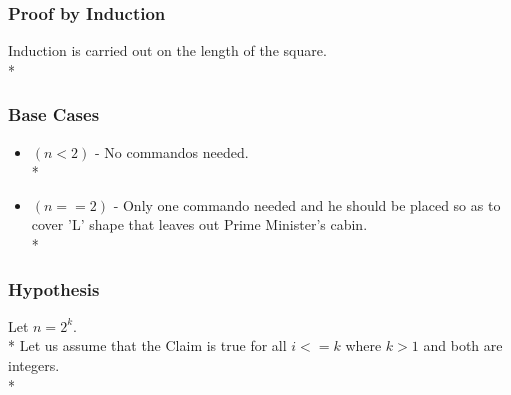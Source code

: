 \documentclass{article}
\begin{document}
\subsubsection{Proof by Induction}
Induction is carried out on the length of the square. \\*
\subsubsection{Base Cases}
\begin{itemize}
\item $(n<2)$ - No commandos needed. \\*
\item $(n==2)$ - Only one commando needed and he should be placed so as to cover 'L' shape that leaves out Prime Minister's cabin. \\*
\end{itemize}
\subsubsection{Hypothesis}
Let $ n = 2^{k} $. \\*
Let us assume that the Claim is true for all $i<=k$ where $k>1$ and both are integers. \\*
\end{document}
